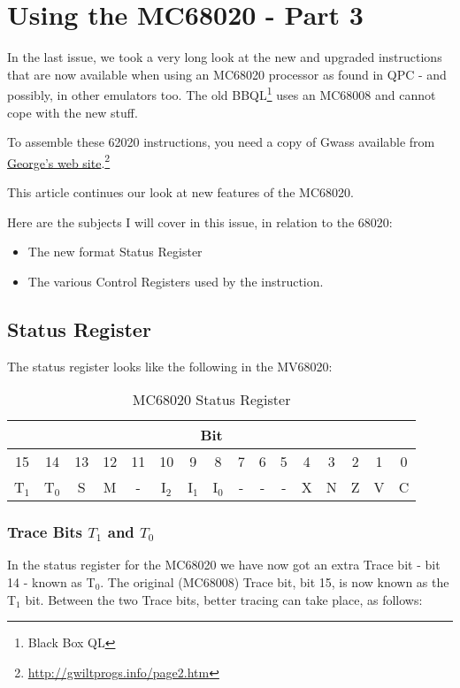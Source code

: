 \chapter{Using the MC68020 - Part 3}

In the last issue, we took a very long look at the new and upgraded instructions that are now available when using an MC68020 processor as found in QPC - and possibly, in other emulators too. The old BBQL\footnote{Black Box QL} uses an MC68008 and cannot cope with the new stuff.

To assemble these 62020 instructions, you need a copy of Gwass available from \href{http://gwiltprogs.info/page2.htm}{George's web site}.\footnote{\url{http://gwiltprogs.info/page2.htm}}

This article continues our look at new features of the MC68020.

Here are the subjects I will cover in this issue, in relation to the 68020:

\begin{itemize}
	\item The new format Status Register
	\item The various Control Registers used by the  instruction.
\end{itemize}

\section{Status Register}

The status register looks like the following in the MV68020:

\begin{table}[h]
	\centering
	\begin{tabular}{|c|c|c|c|c|c|c|c|c|c|c|c|c|c|c|c|}
		\toprule
		\multicolumn{16}{|c|}{Bit}\\
		\midrule
		15     &14     &13&12&11&10     &9      &8      &7&6&5&4&3&2&1&0\\
		\midrule
		T$_{1}$&T$_{0}$&S &M &- &I$_{2}$&I$_{1}$&I$_{0}$&-&-&-&X&N&Z&V&C\\
		\bottomrule
	\end{tabular}
	\caption{MC68020 Status Register}
	\label{tab-MCCR}
\end{table}

\subsection{Trace Bits $T_{1}$ and $T_{0}$}
In the status register for the MC68020 we have now got an extra Trace bit - bit 14 - known as T$_{0}$. The original (MC68008) Trace bit, bit 15, is now known as the T$_{1}$ bit. Between the two Trace bits, better tracing can take place, as follows:

